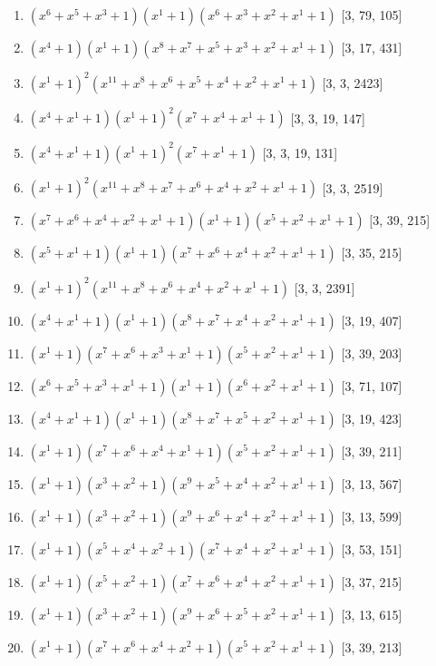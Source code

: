 \documentclass[10pt,twocolumn]{article}
\begin{document}
\begin{enumerate}
\item $(x^{6} + x^{5} + x^{3} + 1)(x^{1} + 1)(x^{6} + x^{3} + x^{2} + x^{1} + 1)$  [3, 79, 105]
\item $(x^{4} + 1)(x^{1} + 1)(x^{8} + x^{7} + x^{5} + x^{3} + x^{2} + x^{1} + 1)$  [3, 17, 431]
\item $(x^{1} + 1)^{2}(x^{11} + x^{8} + x^{6} + x^{5} + x^{4} + x^{2} + x^{1} + 1)$  [3, 3, 2423]
\item $(x^{4} + x^{1} + 1)(x^{1} + 1)^{2}(x^{7} + x^{4} + x^{1} + 1)$  [3, 3, 19, 147]
\item $(x^{4} + x^{1} + 1)(x^{1} + 1)^{2}(x^{7} + x^{1} + 1)$  [3, 3, 19, 131]
\item $(x^{1} + 1)^{2}(x^{11} + x^{8} + x^{7} + x^{6} + x^{4} + x^{2} + x^{1} + 1)$  [3, 3, 2519]
\item $(x^{7} + x^{6} + x^{4} + x^{2} + x^{1} + 1)(x^{1} + 1)(x^{5} + x^{2} + x^{1} + 1)$  [3, 39, 215]
\item $(x^{5} + x^{1} + 1)(x^{1} + 1)(x^{7} + x^{6} + x^{4} + x^{2} + x^{1} + 1)$  [3, 35, 215]
\item $(x^{1} + 1)^{2}(x^{11} + x^{8} + x^{6} + x^{4} + x^{2} + x^{1} + 1)$  [3, 3, 2391]
\item $(x^{4} + x^{1} + 1)(x^{1} + 1)(x^{8} + x^{7} + x^{4} + x^{2} + x^{1} + 1)$  [3, 19, 407]
\item $(x^{1} + 1)(x^{7} + x^{6} + x^{3} + x^{1} + 1)(x^{5} + x^{2} + x^{1} + 1)$  [3, 39, 203]
\item $(x^{6} + x^{5} + x^{3} + x^{1} + 1)(x^{1} + 1)(x^{6} + x^{2} + x^{1} + 1)$  [3, 71, 107]
\item $(x^{4} + x^{1} + 1)(x^{1} + 1)(x^{8} + x^{7} + x^{5} + x^{2} + x^{1} + 1)$  [3, 19, 423]
\item $(x^{1} + 1)(x^{7} + x^{6} + x^{4} + x^{1} + 1)(x^{5} + x^{2} + x^{1} + 1)$  [3, 39, 211]
\item $(x^{1} + 1)(x^{3} + x^{2} + 1)(x^{9} + x^{5} + x^{4} + x^{2} + x^{1} + 1)$  [3, 13, 567]
\item $(x^{1} + 1)(x^{3} + x^{2} + 1)(x^{9} + x^{6} + x^{4} + x^{2} + x^{1} + 1)$  [3, 13, 599]
\item $(x^{1} + 1)(x^{5} + x^{4} + x^{2} + 1)(x^{7} + x^{4} + x^{2} + x^{1} + 1)$  [3, 53, 151]
\item $(x^{1} + 1)(x^{5} + x^{2} + 1)(x^{7} + x^{6} + x^{4} + x^{2} + x^{1} + 1)$  [3, 37, 215]
\item $(x^{1} + 1)(x^{3} + x^{2} + 1)(x^{9} + x^{6} + x^{5} + x^{2} + x^{1} + 1)$  [3, 13, 615]
\item $(x^{1} + 1)(x^{7} + x^{6} + x^{4} + x^{2} + 1)(x^{5} + x^{2} + x^{1} + 1)$  [3, 39, 213]

\end{enumerate}
\end{document}
